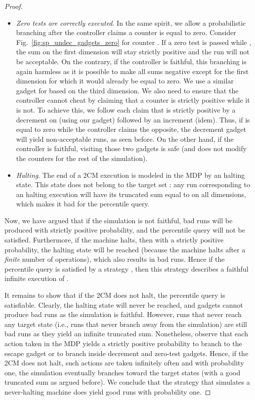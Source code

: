 \documentclass{llncs}
\begin{document}
\begin{proof}
\begin{itemize}
\item \textit{Zero tests are correctly executed}. In the same spirit, we allow a probabilistic branching after the controller claims a counter is equal to zero. Consider Fig.~\ref{fig:sp_undec_gadgets_zero} for counter . If a zero test is passed while , the sum on the first dimension will stay strictly positive and the run will not be acceptable. On the contrary, if the controller is faithful, this branching is again harmless as it is possible to make all sums negative except for the first dimension for which it would already be equal to zero. We use a similar gadget for  based on the third dimension. We also need to ensure that the controller cannot cheat by claiming that a counter is strictly positive while it is not. To achieve this, we follow each claim that  is strictly positive by a decrement on  (using our gadget) followed by an increment (idem). Thus, if  is equal to zero while the controller claims the opposite, the decrement gadget will yield non-acceptable runs, as seen before. On the other hand, if the controller is faithful, visiting those two gadgets is safe (and does not modify the counters for the rest of the simulation).

\item \textit{Halting}. The end of a 2CM execution is modeled in the MDP by an halting state. This state does not belong to the target set : any run corresponding to an halting execution will have its truncated sum equal to  on all dimensions, which makes it bad for the percentile query.

\end{itemize}

Now, we have argued that if the simulation is not faithful, bad runs will be produced with strictly positive probability, and the percentile query will not be satisfied. Furthermore, if the machine halts, then with a strictly positive probability, the halting state will be reached (because the machine halts after a \textit{finite} number of operations), which also results in bad runs. Hence if the percentile query is satisfied by a strategy , then this strategy describes a faithful infinite execution of .

It remains to show that if the 2CM does not halt, the percentile query is satisfiable. Clearly, the halting state will never be reached, and gadgets cannot produce bad runs as the simulation is faithful. However, runs that never reach any target state (i.e., runs that never branch away from the simulation) are still bad runs as they yield an infinite truncated sum. Nonetheless, observe that each action taken in the MDP yields a strictly positive probability to branch to the escape gadget or to branch inside decrement and zero-test gadgets. Hence, if the 2CM does not halt, such actions are taken infinitely often and with probability one, the simulation eventually branches toward the target states (with a good truncated sum as argued before). We conclude that the strategy that simulates a never-halting machine does yield good runs with probability one.


\end{proof}
\end{document}

